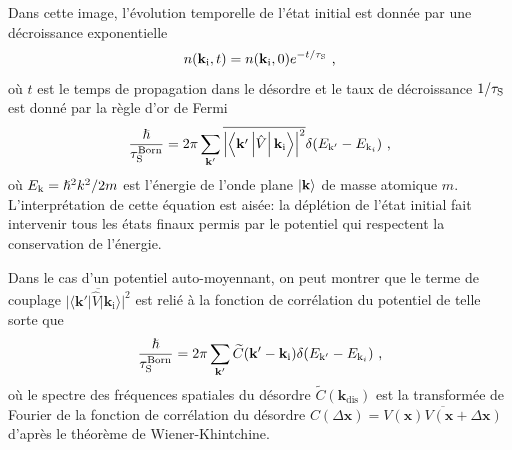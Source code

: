 Dans cette image, l'évolution temporelle de l'état initial est donnée par une décroissance exponentielle 
\begin{equation}
n(\mathbf{k}_{\mathrm{i}},t)=n(\mathbf{k}_{\mathrm{i}},0) e^{-t/\tau_{\mathrm{S}}} \text{ ,}
\label{eq:decroissance_exponentielle_taus}
\end{equation}
où $t$ est le temps de propagation dans le désordre et le taux de décroissance $1/\tau_{\mathrm{S}}$ est donné par la règle d'or de Fermi
\begin{equation}
\frac{\hslash}{\tau_{\mathrm{S}}^{\mathrm{Born}}}=2\pi \sum_{\mathbf{k}'}{\overline{\left |\left\langle \mathbf{k}' \left|  \hat{V} \right| \mathbf{k}_{\mathrm{i}} \right\rangle \right|^2} \delta(E_{\mathrm{k}'} - E_{\mathrm{k}_i})} \text{ ,}
\label{eq:fermi_golden_rule}
\end{equation}
où $E_{\mathrm{k}}=\hslash^2 k^2 /2m$ est l'énergie de l'onde plane $\left| \mathbf{k} \right\rangle$ de masse atomique $m$. L'interprétation de cette équation est aisée: la déplétion de l'état initial fait intervenir tous les états finaux permis par le potentiel qui respectent la conservation de l'énergie. 

Dans le cas d'un potentiel auto-moyennant, on peut montrer que le terme de couplage $\overline{|\langle \mathbf{k}'| \hat{V} | \mathbf{k}_{\mathrm{i}} \rangle|^2}$ est relié à la fonction de corrélation du potentiel de telle sorte que \citep{bernard2010transport}
\begin{equation}
\frac{\hslash}{\tau_{\mathrm{S}}^{\mathrm{Born}}}=2\pi \sum_{\mathbf{k}'}{\widetilde{C}(\mathbf{k}'-\mathbf{k}_{\mathrm{i}}) \delta(E_{\mathrm{k}'}  - E_{\mathrm{k}_i})} \text{ ,}
\label{eq:fermi_taus}
\end{equation}
où le spectre des fréquences spatiales du désordre $\widetilde{C}(\mathbf{k}_{\mathrm{dis}})$ est la transformée de Fourier de la fonction de corrélation du désordre $C(\Delta\mathbf{x})=\overline{V(\mathbf{x}) V(\mathbf{x}+\Delta\mathbf{x})}$ d'après le théorème de Wiener-Khintchine.

